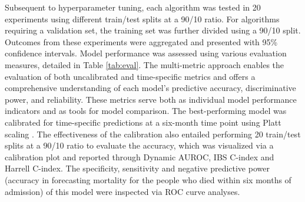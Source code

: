 \documentclass{article}
\begin{document}
Subsequent to hyperparameter tuning, each algorithm was tested in 20 experiments using different train/test splits at a 90/10 ratio. For algorithms requiring a validation set, the training set was further divided using a 90/10 split. Outcomes from these experiments were aggregated and presented with 95\% confidence intervals.
Model performance was assessed using various evaluation measures, detailed in Table \ref{tab:eval}. The multi-metric approach enables the evaluation of both uncalibrated and time-specific metrics and offers a comprehensive understanding of each model's predictive accuracy, discriminative power, and reliability. These metrics serve both as individual model performance indicators and as tools for model comparison. The best-performing model was calibrated for time-specific predictions at a six-month time point using Platt scaling \cite{niculescu2005predicting,rajaraman2022calibration}.
The effectiveness of the calibration also entailed performing 20 train/test splits at a 90/10 ratio to evaluate the accuracy, which was visualized via a calibration plot and reported through Dynamic AUROC, IBS C-index and Harrell C-index.
The specificity, sensitivity and negative predictive power (accuracy in forecasting mortality for the people who died within six months of admission) of this model were inspected via ROC curve analyses.
\end{document}
